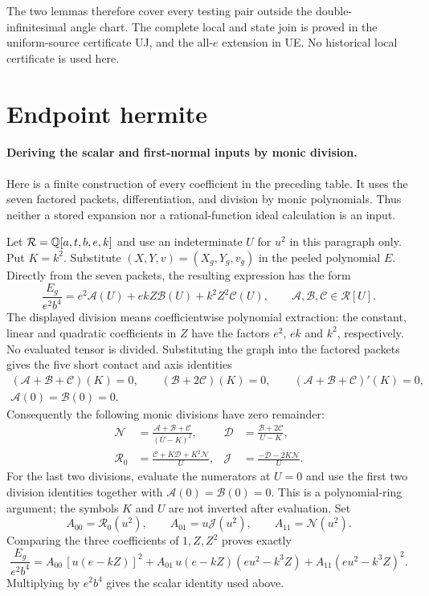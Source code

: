The two lemmas therefore cover every testing pair outside
the double-infinitesimal angle chart. The complete local and state
join is proved in the uniform-source certificate UJ, and the all-$e$
extension in UE. No historical local certificate is used here.


\section{\texorpdfstring{Endpoint hermite}{Endpoint hermite}}
\label{component:p935c9d6318ea}
\paragraph{Deriving the scalar and first-normal inputs by monic division.}
Here is a finite construction of every coefficient in the preceding table. It uses the seven factored packets, differentiation, and division by monic polynomials. Thus neither a stored expansion nor a rational-function ideal calculation is an input.

Let $\mathcal R=\mathbb Q[a,t,b,e,k]$ and use an indeterminate $U$ for $u^2$ in this paragraph only. Put $K=k^2$. Substitute $(X,Y,v)=(X_g,Y_g,v_g)$ in the peeled polynomial $E$. Directly from the seven packets, the resulting expression has the form
\[
\frac{E_g}{e^2b^4}=e^2\mathcal A(U)+ekZ\mathcal B(U)+k^2Z^2\mathcal C(U),
\qquad \mathcal A,\mathcal B,\mathcal C\in\mathcal R[U].
\]
The displayed division means coefficientwise polynomial extraction: the constant, linear and quadratic coefficients in $Z$ have the factors $e^2$, $ek$ and $k^2$, respectively. No evaluated tensor is divided. Substituting the graph into the factored packets gives the five short contact and axis identities
\begin{gather*}
(\mathcal A+\mathcal B+\mathcal C)(K)=0,\qquad
(\mathcal B+2\mathcal C)(K)=0,\qquad
(\mathcal A+\mathcal B+\mathcal C)'(K)=0,\\
\mathcal A(0)=\mathcal B(0)=0.
\end{gather*}
Consequently the following monic divisions have zero remainder:
\begin{align*}
\mathcal N&=\frac{\mathcal A+\mathcal B+\mathcal C}{(U-K)^2},&
\mathcal D&=\frac{\mathcal B+2\mathcal C}{U-K},\\
\mathcal R_0&=\frac{\mathcal C+K\mathcal D+K^2\mathcal N}{U},&
\mathcal J&=\frac{-\mathcal D-2K\mathcal N}{U}.
\end{align*}
For the last two divisions, evaluate the numerators at $U=0$ and use the first two division identities together with $\mathcal A(0)=\mathcal B(0)=0$. This is a polynomial-ring argument; the symbols $K$ and $U$ are not inverted after evaluation. Set
\[
A_{00}=\mathcal R_0(u^2),\qquad A_{01}=u\mathcal J(u^2),
\qquad A_{11}=\mathcal N(u^2).
\]
Comparing the three coefficients of $1,Z,Z^2$ proves exactly
\[
\frac{E_g}{e^2b^4}
=A_{00}\,[u(e-kZ)]^2+A_{01}\,u(e-kZ)(eu^2-k^3Z)
 +A_{11}(eu^2-k^3Z)^2.
\]
Multiplying by $e^2b^4$ gives the scalar identity used above.

